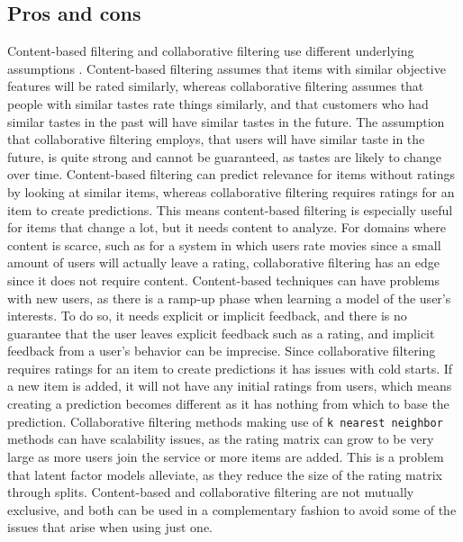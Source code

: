 \subsection{Pros and cons}\label{sec:recommender-pros-and-cons}
Content-based filtering and collaborative filtering use different underlying assumptions \cite{CollaborativeFiltering}.
Content-based filtering assumes that items with similar objective features will be rated similarly, whereas collaborative filtering assumes that people with similar tastes rate things similarly, and that customers who had similar tastes in the past will have similar tastes in the future.
The assumption that collaborative filtering employs, that users will have similar taste in the future, is quite strong and cannot be guaranteed, as tastes are likely to change over time.
Content-based filtering can predict relevance for items without ratings by looking at similar items, whereas collaborative filtering requires ratings for an item to create predictions.
This means content-based filtering is especially useful for items that change a lot, but it needs content to analyze.
For domains where content is scarce, such as for a system in which users rate movies since a small amount of users will actually leave a rating, collaborative filtering has an edge since it does not require content.
Content-based techniques can have problems with new users, as there is a ramp-up phase when learning a model of the user's interests.
To do so, it needs explicit or implicit feedback, and there is no guarantee that the user leaves explicit feedback such as a rating, and implicit feedback from a user's behavior can be imprecise.
Since collaborative filtering requires ratings for an item to create predictions it has issues with cold starts.
If a new item is added, it will not have any initial ratings from users, which means creating a prediction becomes different as it has nothing from which to base the prediction.
Collaborative filtering methods making use of \texttt{k nearest neighbor} methods can have scalability issues, as the rating matrix can grow to be very large as more users join the service or more items are added.
This is a problem that latent factor models alleviate, as they reduce the size of the rating matrix through splits.
Content-based and collaborative filtering are not mutually exclusive, and both can be used in a complementary fashion to avoid some of the issues that arise when using just one.

